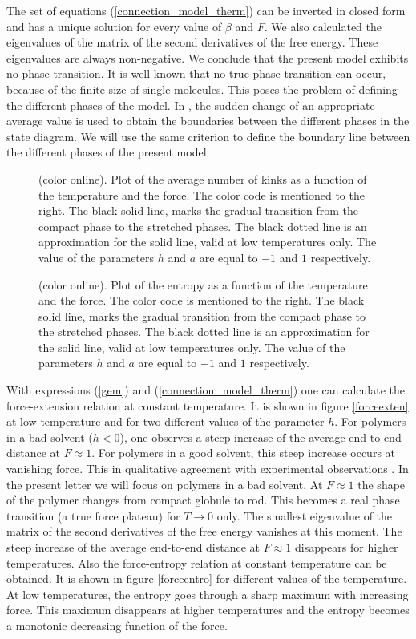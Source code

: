 \documentclass[doublecol,figures]{epl2}
\begin{document}
The set of equations (\ref{connection_model_therm}) can be inverted in closed
form and has a unique solution for every value of $\beta$ and $F$. We also
calculated the eigenvalues of the matrix of the second derivatives of the free
energy. These eigenvalues are always non-negative. We conclude that the present
model exhibits no phase transition. It is well known that no true phase
transition can occur, because of the finite size of single molecules. This
poses the problem of defining the different phases of the model. In
\cite{referee6}, the sudden change of an appropriate average value is used to
obtain the boundaries between the different phases in the state diagram. We will
use the same criterion to define the boundary line between the different phases
of the present model.
\begin{figure}
\caption{(color online). Plot of the average number of kinks
as a function of the temperature and the force. The
color code is mentioned to the right. The black solid line, marks the gradual transition from the compact phase to the stretched phases. The black dotted line is an approximation for the solid
line, valid at low temperatures only. The value of the parameters $h$ and $a$ are equal to $-1$ and $1$ respectively.}
\label{phasekink}
\end{figure}
\begin{figure}
\caption{(color online). Plot of the entropy as a function of the temperature and the force. The
color code is mentioned to the right. The black solid line, marks the gradual transition from the compact phase to the stretched phases. The black dotted line is an approximation for the solid
line, valid at low temperatures only. The value of the parameters $h$ and $a$ are equal to $-1$ and $1$ respectively.}
\label{phaseentro}
\end{figure}

With expressions (\ref{gem}) and (\ref{connection_model_therm}) one can calculate the force-extension relation at constant temperature. It is shown in figure \ref{forceexten} at low temperature and for two different values of the parameter $h$. For polymers in a bad solvent ($h<0$), one observes a steep increase of the average end-to-end distance at $F\approx1$. For polymers in a good solvent, this steep increase occurs at vanishing force. This in qualitative agreement with experimental observations \cite{referee3,referee4}. In the present letter we will focus on polymers in a bad solvent. At $F\approx1$ the shape of the polymer changes from compact globule to rod. This
becomes a real phase transition (a true force plateau) for $T\rightarrow0$ only.
The smallest eigenvalue of the matrix of the second derivatives of the free
energy vanishes at this moment. The steep increase of the average end-to-end distance at $F\approx1$ disappears for higher
temperatures. Also the force-entropy relation at constant temperature can be
obtained. It is shown in figure \ref{forceentro} for different values of the
temperature. At low temperatures, the entropy goes through a sharp maximum with
increasing force. This maximum disappears at higher temperatures and the entropy
becomes a monotonic decreasing function of the force.
\end{document}
